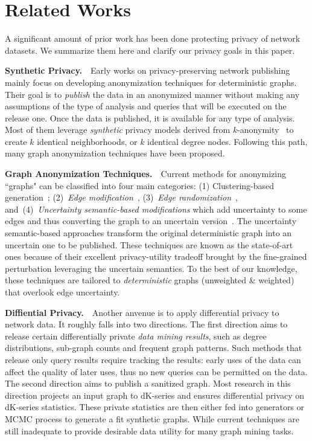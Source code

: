 \section{Related Works}
A significant amount of prior work has been done protecting privacy of network datasets.
We summarize them here and clarify our privacy goals in this paper. 

\textbf{Synthetic Privacy.}~~Early works on privacy-preserving network publishing mainly focus on developing anonymization techniques for deterministic graphs. Their goal is to \emph{publish} the data in an anonymized manner without making any assumptions of the type of analysis and queries that will be executed on the release one. Once the data is published, it is available for any type of analysis. Most of them leverage \emph{synthetic} privacy models derived from $k$-anonymity~\cite{Sweeney:2002:KAM:774544.774552} to create $k$ identical neighborhoods, or $k$ identical degree nodes. Following this path, many graph anonymization techniques have been proposed.

\textbf{Graph Anonymization Techniques.}~~Current methods for anonymizing ``graphs" can be classified into four main categories: (1) Clustering-based generation~\cite{Hay_Anonymizing_2007,Bhagat_Class_2009,hay2010resisting}; (2)~{\em Edge modification}~\cite{Liu_Towards_2008, Zhou_Preserving_2008, Wang2011, Wu_k_2010, Skarkala_Privacy_2012}, 
(3)~{\em Edge randomization}~\cite{Liu_Privacy_2009,Ying_Randomizing_2008, Ninggal_Utility_2015},
and~(4)~{\em Uncertainty semantic-based modifications} which add uncertainty to some edges and thus converting the graph to an uncertain version~\cite{Boldi_Injecting_2012, Nguyen_Anonymizing_2015}. The uncertainty semantic-based approaches transform the original deterministic graph into an uncertain one to be published. These techniques are known as the state-of-art ones because of their excellent privacy-utility tradeoff brought by the fine-grained perturbation leveraging the uncertain semantics. To the best of our knowledge, these techniques are tailored to \emph{deterministic} graphs (unweighted \& weighted) that overlook edge uncertainty.  

\textbf{Diffiential Privacy.}~~Another anvenue is to apply differential privacy to network data. It roughly falls into two directions. The first direction aims to release certain differentially private \emph{data mining results}, such as degree distributions, sub-graph counts and frequent graph patterns. Such methods that release only query results require tracking the results: early uses of the data can affect the quality of later uses, thus no new queries can be permitted on the data.  
The second direction aims to publish a sanitized graph. Most research in this direction projects an input graph to dK-series and ensures differential privacy on dK-series statistics. These private statistics are then either fed into generators or MCMC process to generate a fit synthetic graphs. While current techniques are still inadequate to provide desirable data utility for many graph mining tasks. 


